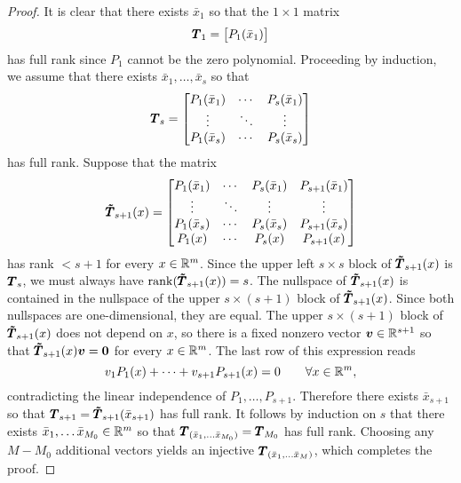 \documentclass[twoside,11pt]{article}
\begin{document}
\begin{proof}
    It is clear that there exists $\bar{x}_1$ so that the $1\times 1$ matrix
    \begin{equation}
        {\pmb{T}}_1 = \begin{bmatrix}
            P_1(\bar{x}_1)
        \end{bmatrix}
    \end{equation}
    has full rank since $P_1$ cannot be the zero polynomial.
    Proceeding by induction, we assume that there exists $\bar{x}_1, \ldots, \bar{x}_s$ so that
    \begin{equation}
        {\pmb{T}}_s = \begin{bmatrix}
            P_1(\bar{x}_1) & \cdots & P_{s}(\bar{x}_1) \\
            \vdots & \ddots & \vdots \\
            P_{1}(\bar{x}_s) & \cdots & P_s(\bar{x}_s)
        \end{bmatrix}
    \end{equation}
    has full rank.
    Suppose that the matrix
    \begin{equation}
        {\pmb{\tilde{T}}}_{s+1}(x) = 
        \begin{bmatrix}
            P_1(\bar{x}_1) & \cdots & P_{s}(\bar{x}_1) & P_{s+1}(\bar{x}_1) \\
            \vdots & \ddots & \vdots & \vdots \\
            P_{1}(\bar{x}_s) & \cdots & P_s(\bar{x}_s) & P_{s+1}(\bar{x}_s) \\
            P_{1}(x) & \cdots & P_s(x) & P_{s+1}(x)
        \end{bmatrix}
    \end{equation}
    has rank $< s+1$ for every $x \in \mathbb{R}^m$.
    Since the upper left $s\times s$ block of ${\pmb{\tilde{T}}}_{s+1}(x)$ is ${\pmb{T}}_s$, we must always have $\operatorname{rank}({\pmb{\tilde{T}}}_{s+1}(x)) = s$.
    The nullspace of ${\pmb{\tilde{T}}}_{s+1}(x)$ is contained in the nullspace of the upper $s\times(s+1)$ block of ${\pmb{\tilde{T}}}_{s+1}(x)$.
    Since both nullspaces are one-dimensional, they are equal.
    The upper $s\times(s+1)$ block of ${\pmb{\tilde{T}}}_{s+1}(x)$ does not depend on $x$, so there is a fixed nonzero vector ${\boldsymbol{v}}\in\mathbb{R}^{s+1}$ so that ${\pmb{\tilde{T}}}_{s+1}(x) {\boldsymbol{v}} = {\boldsymbol{0}}$ for every $x\in\mathbb{R}^m$.
    The last row of this expression reads
    \begin{equation}
        v_1 P_1(x) + \cdots + v_{s+1} P_{s+1}(x) = 0 \qquad \forall x\in\mathbb{R}^m,
    \end{equation}
    contradicting the linear independence of $P_1, \ldots, P_{s+1}$.
    Therefore there exists $\bar{x}_{s+1}$ so that ${\pmb{T}}_{s+1} = {\pmb{\tilde{T}}}_{s+1}(\bar{x}_{s+1})$ has full rank.
    It follows by induction on $s$ that there exists $\bar{x}_1, \ldots \bar{x}_{M_0}\in \mathbb{R}^m$ so that ${\pmb{T}}_{(\bar{x}_1, \ldots \bar{x}_{M_0})} = {\pmb{T}}_{M_0}$ has full rank.
    Choosing any $M - M_0$ additional vectors yields an injective ${\pmb{T}}_{(\bar{x}_1, \ldots \bar{x}_{M})}$, which completes the proof.
\end{proof}
\end{document}
